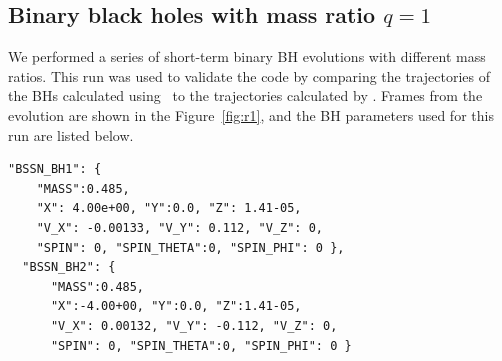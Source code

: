 \begin{table}
	\centering
{}
\caption{Violation of constraint equations with time for an equal mass ratio binary merger simulation done using OT. Note that $\mathcal{H}$, $M1,M2,M3$ denotes the Hamiltonian \& 3 momentum component constraints that is being monitored through the evolution.}
\label{tb:constraints}
\end{table}





\subsection{Binary black holes with mass ratio $q=1$}

We performed a series of short-term binary BH evolutions with different
mass ratios. This run was used to validate the code by comparing the
trajectories of the BHs calculated using \dendro\ to the trajectories calculated
by \HAD. Frames from the evolution are shown in the Figure~\ref{fig:r1},
and the BH parameters used for this run are listed below.

\begin{lstlisting}[basicstyle=\small]
  "BSSN_BH1": {
    "MASS":0.485,
    "X": 4.00e+00, "Y":0.0, "Z": 1.41-05,
    "V_X": -0.00133, "V_Y": 0.112, "V_Z": 0,
    "SPIN": 0, "SPIN_THETA":0, "SPIN_PHI": 0 },
  "BSSN_BH2": {
      "MASS":0.485,
      "X":-4.00+00, "Y":0.0, "Z":1.41-05,
      "V_X": 0.00132, "V_Y": -0.112, "V_Z": 0,
      "SPIN": 0, "SPIN_THETA":0, "SPIN_PHI": 0 }
\end{lstlisting}


